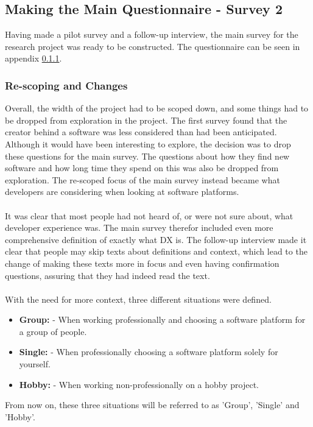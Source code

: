 \documentclass{cslthse-msc}
\begin{document}
    \subsection{Making the Main Questionnaire - Survey 2}

    Having made a pilot survey and a follow-up interview, the main survey for the research project was ready to be constructed.
    The questionnaire can be seen in appendix \ref{}.

    \subsubsection{Re-scoping and Changes}
    Overall, the width of the project had to be scoped down, and some
    things had to be dropped from exploration in the project. The
    first survey found that the creator behind a software was less
    considered than had been anticipated. Although it would have been interesting to explore, the decision was to drop these questions for the main survey.
    The questions about how they find new software
    and how long time they spend on this was also be dropped from
    exploration. The re-scoped focus of the main survey instead became what developers are considering when looking at software platforms.
    \\ \\
    It was clear that most people had not heard of, or were not sure about,
    what developer experience was. The main survey therefor included even more comprehensive definition of exactly what DX is.
    The follow-up interview made it clear that people may skip texts about definitions and context, which lead to the change of making these texts more in focus and even having confirmation questions, assuring that they had indeed read the text.
    \\ \\
    With the need for more context, three different situations were defined.
    \begin{itemize}[label={}]
        \item \textbf{Group:} - When working professionally and choosing a software platform for a group of people.
        \item \textbf{Single:} - When professionally choosing a software platform solely for yourself.
        \item \textbf{Hobby:} - When working non-professionally on a hobby project.
    \end{itemize}
    From now on, these three situations will be referred to as 'Group', 'Single' and 'Hobby'.
\end{document}
